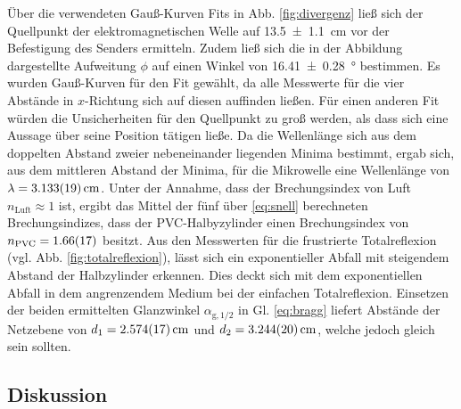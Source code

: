 		Über die verwendeten Gauß-Kurven Fits in Abb. \ref{fig:divergenz} ließ sich der Quellpunkt der elektromagnetischen Welle auf \SI{13.5+-1.1}{\centi\meter} vor der Befestigung des Senders ermitteln.
		Zudem ließ sich die in der Abbildung dargestellte Aufweitung $\phi$ auf einen Winkel von \SI{16.41+-0.28}{\degree} bestimmen.
		Es wurden Gauß-Kurven für den Fit gewählt, da alle Messwerte für die vier Abstände in $x$-Richtung sich auf diesen auffinden ließen. 
		Für einen anderen Fit würden die Unsicherheiten für den Quellpunkt zu groß werden, als dass sich eine Aussage über seine Position tätigen ließe. %
		Da die Wellenlänge sich aus dem doppelten Abstand zweier nebeneinander liegenden Minima bestimmt, ergab sich, aus dem mittleren Abstand der Minima, für die Mikrowelle eine Wellenlänge von $\lambda = \SI{3.133+-0.019}{\centi\meter}$. 
		Unter der Annahme, dass der Brechungsindex von Luft $n_\text{Luft}\approx 1$ ist, ergibt das Mittel der fünf über \ref{eq:snell} berechneten Brechungsindizes, dass der PVC-Halbyzylinder einen Brechungsindex von $n_\text{PVC} = \SI{1.66+-0.17}{}$ besitzt.
		Aus den Messwerten für die frustrierte Totalreflexion (vgl. Abb. \ref{fig:totalreflexion}), lässt sich ein exponentieller Abfall mit steigendem Abstand der Halbzylinder erkennen.
		Dies deckt sich mit dem exponentiellen Abfall in dem angrenzendem Medium bei der einfachen Totalreflexion.
		Einsetzen der beiden ermittelten Glanzwinkel $\alpha_{\text{g},1/2}$ in Gl. \ref{eq:bragg} liefert Abstände der Netzebene von $d_1 = \SI{2.574+-0.017}{\centi\meter}$ und $d_2 = \SI{3.244+-0.020}{\centi\meter}$, welche jedoch gleich sein sollten.
		
	\subsection{Diskussion}
	
